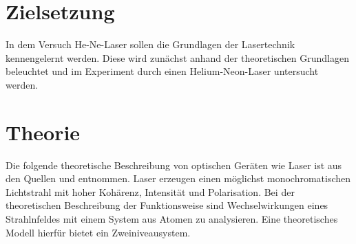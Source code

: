 \section{Zielsetzung}
\label{sec:Zielsetzung}

In dem Versuch He-Ne-Laser sollen die Grundlagen der Lasertechnik kennengelernt
werden. Diese wird zunächst anhand der theoretischen Grundlagen beleuchtet und
im Experiment durch einen Helium-Neon-Laser untersucht werden.

\section{Theorie}
\label{sec:Theorie}
Die folgende theoretische Beschreibung von optischen Geräten wie Laser ist aus den Quellen
\cite{anleitung} und \cite{eichler} entnommen. Laser erzeugen einen möglichst monochromatischen
Lichtstrahl mit hoher Kohärenz, Intensität und Polarisation. Bei der theoretischen
Beschreibung der Funktionsweise sind Wechselwirkungen eines Strahlnfeldes mit einem
System aus Atomen zu analysieren. Eine theoretisches Modell hierfür bietet ein
Zweiniveausystem.

